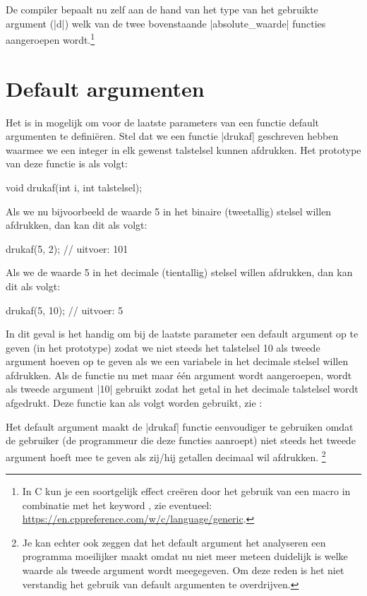 \begin{cpplstShortInline}
De compiler bepaalt nu zelf aan de hand van het type van het gebruikte argument (|d|) welk van de twee bovenstaande |absolute_waarde| functies aangeroepen wordt.\footnote{%
	In C kun je een soortgelijk effect creëren door het gebruik van een macro in combinatie met het keyword , zie eventueel: \url{https://en.cppreference.com/w/c/language/generic}.
}

\section{Default argumenten}
\label{sec:defaultarguments}
Het is in \Cpp{} mogelijk om voor de laatste parameters van een functie default argumenten te definiëren.
Stel dat we een functie |drukaf| geschreven hebben waarmee we een integer in elk gewenst talstelsel kunnen afdrukken.
Het prototype van deze functie is als volgt:
\begin{cpplstfragment}
void drukaf(int i, int talstelsel);
\end{cpplstfragment}

Als we nu bijvoorbeeld de waarde 5 in het binaire (tweetallig) stelsel willen afdrukken, dan kan dit als volgt:
\begin{cpplstfragment}
    drukaf(5, 2);  // uitvoer: 101
\end{cpplstfragment}
Als we de waarde 5 in het decimale (tientallig) stelsel willen afdrukken, dan kan dit als volgt:
\begin{cpplstfragment}
    drukaf(5, 10); // uitvoer: 5
\end{cpplstfragment}
In dit geval is het handig om bij de laatste parameter een default argument op te geven (in het prototype) zodat we niet steeds het talstelsel 10 als tweede argument hoeven op te geven als we een variabele in het decimale stelsel willen afdrukken.
Als de functie nu met maar één argument wordt aangeroepen, wordt als tweede argument |10| gebruikt zodat het getal in het decimale talstelsel wordt afgedrukt.
Deze functie kan als volgt worden gebruikt, zie :

Het default argument maakt de |drukaf| functie eenvoudiger te gebruiken omdat de gebruiker (de programmeur die deze functies aanroept) niet steeds het tweede argument hoeft mee te geven als zij/hij getallen decimaal wil afdrukken.%
\footnote{%
    Je kan echter ook zeggen dat het default argument het analyseren een programma moeilijker maakt omdat nu niet meer meteen duidelijk is welke waarde als tweede argument wordt meegegeven. 
    Om deze reden is het niet verstandig het gebruik van default argumenten te overdrijven.
}


\end{cpplstShortInline}
